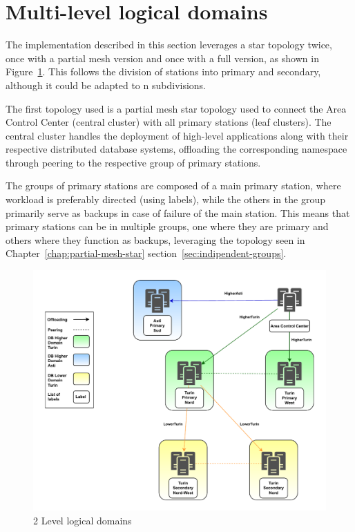 \section{Multi-level logical domains}
The implementation described in this section leverages a star topology twice, once with a partial mesh version and once with a full version, as shown in Figure~\ref{fig:level-imp}. This follows the division of stations into primary and secondary, although it could be adapted to n subdivisions.

The first topology used is a partial mesh star topology used to connect the Area Control Center (central cluster) with all primary stations (leaf clusters). The central cluster handles the deployment of high-level applications along with their respective distributed database systems, offloading the corresponding namespace through peering to the respective group of primary stations.

The groups of primary stations are composed of a main primary station, where workload is preferably directed (using labels), while the others in the group primarily serve as backups in case of failure of the main station. This means that primary stations can be in multiple groups, one where they are primary and others where they function as backups, leveraging the topology seen in Chapter~\ref{chap:partial-mesh-star} section~\ref{sec:indipendent-groups}.

\begin{figure}[ht]\centering
\includegraphics[scale=0.5]{Pictures/2level}
\caption{2 Level logical domains }\label{fig:level-imp}
\end{figure}

